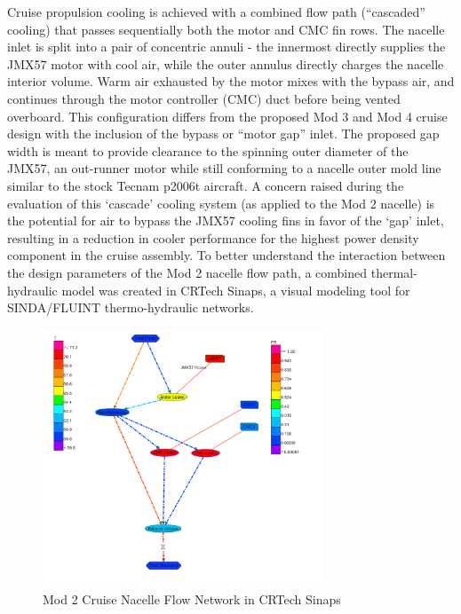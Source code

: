 \documentclass[]{aiaa-tc}%
\begin{document}
Cruise propulsion cooling is achieved with a combined flow path (“cascaded” cooling) that passes sequentially both the motor and CMC fin rows.  The nacelle inlet is split into a pair of concentric annuli - the innermost directly supplies the JMX57 motor with cool air, while the outer annulus directly charges the nacelle interior volume.  Warm air exhausted by the motor mixes with the bypass air, and continues through the motor controller (CMC) duct before being vented overboard.  
This configuration differs from the proposed Mod 3 and Mod 4 cruise design with the inclusion of the bypass or “motor gap” inlet.  The proposed gap width is meant to provide clearance to the spinning outer diameter of the JMX57, an out-runner motor while still conforming to a nacelle outer mold line similar to the stock Tecnam p2006t aircraft. 
A concern raised during the evaluation of this ‘cascade’ cooling system (as applied to the Mod 2 nacelle) is the potential for air to bypass the JMX57 cooling fins in favor of the ‘gap’ inlet, resulting in a reduction in cooler performance for the highest power density component in the cruise assembly.  
To better understand the interaction between the design parameters of the Mod 2 nacelle flow path, a combined thermal-hydraulic model was created in CRTech Sinaps, a visual modeling tool for SINDA/FLUINT thermo-hydraulic networks. 

\begin{figure}[!htb]%
	\centering
	\includegraphics[width=0.75\textwidth]{figures/sinaps_paramsweep.PNG}
	\caption{Mod 2 Cruise Nacelle Flow Network in CRTech Sinaps}
	\label{fig:Sinaps}
\end{figure}
\end{document}
